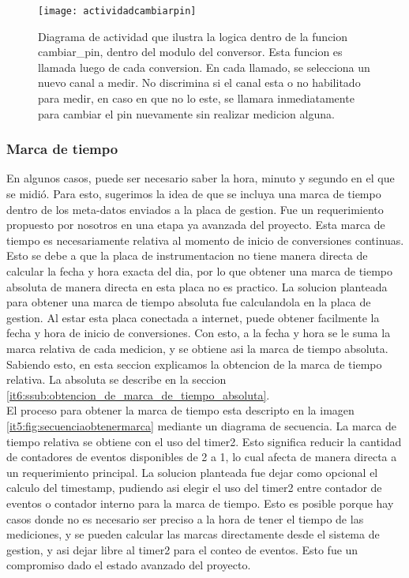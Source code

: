 \begin{figure}[h]
  \centering
  \texttt{[image: actividadcambiarpin]}
  \caption[Diagrama de actividad de la funcion cambiar pin]{Diagrama de actividad que ilustra la logica dentro de la funcion cambiar\_pin, dentro del modulo del conversor. Esta funcion es llamada luego de cada conversion. En cada llamado, se selecciona un nuevo canal a medir. No discrimina si el canal esta o no habilitado para medir, en caso en que no lo este, se llamara inmediatamente para cambiar el pin nuevamente sin realizar medicion alguna.}\label{it5:fig:actividadcambiarpin}
\end{figure}

\subsubsection{Marca de tiempo} %
\label{ssub:marca_de_tiempo}

En algunos casos, puede ser necesario saber la hora, minuto y segundo en el que se midió. Para esto, sugerimos la idea de que se incluya una marca de tiempo dentro de los meta-datos enviados a la placa de gestion. Fue un requerimiento propuesto por nosotros en una etapa ya avanzada del proyecto. Esta marca de tiempo es necesariamente relativa al momento de inicio de conversiones continuas. Esto se debe a que la placa de instrumentacion no tiene manera directa de calcular la fecha y hora exacta del dia, por lo que obtener una marca de tiempo absoluta de manera directa en esta placa no es practico. 
La solucion planteada para obtener una marca de tiempo absoluta fue calculandola en la placa de gestion. Al estar esta placa conectada a internet, puede obtener facilmente la fecha y hora de inicio de conversiones. Con esto, a la fecha y hora se le suma la marca relativa de cada medicion, y se obtiene asi la marca de tiempo absoluta. Sabiendo esto, en esta seccion explicamos la obtencion de la marca de tiempo relativa. La absoluta se describe en la seccion \ref{it6:ssub:obtencion_de_marca_de_tiempo_absoluta}. \\

El proceso para obtener la marca de tiempo esta descripto en la imagen \ref{it5:fig:secuenciaobtenermarca} mediante un diagrama de secuencia. La marca de tiempo relativa se obtiene con el uso del timer2. Esto significa reducir la cantidad de contadores de eventos disponibles de 2 a 1, lo cual afecta de manera directa a un requerimiento principal. La solucion planteada fue dejar como opcional el calculo del timestamp, pudiendo asi elegir el uso del timer2 entre contador de eventos o contador interno para la marca de tiempo. Esto es posible porque hay casos donde no es necesario ser preciso a la hora de tener el tiempo de las mediciones, y se pueden calcular las marcas directamente desde el sistema de gestion, y asi dejar libre al timer2 para el conteo de eventos. Esto fue un compromiso dado el estado avanzado del proyecto.


